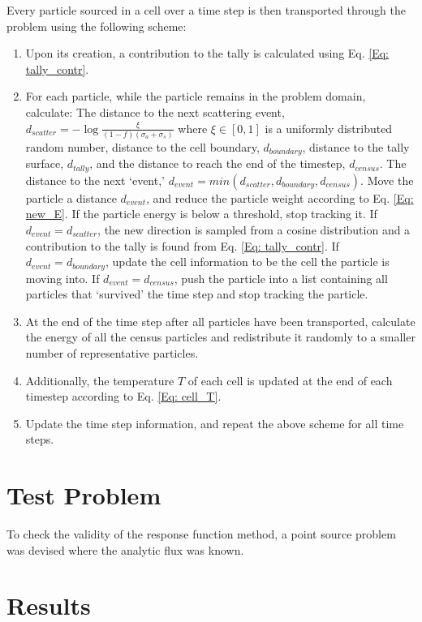 \documentclass[]{article}
\begin{document}
    Every particle sourced in a cell over a time step is then transported through the problem using the following scheme:
	\begin{enumerate}
		\item Upon its creation, a contribution to the tally is calculated using Eq. \ref{Eq: tally_contr}.
		\item For each particle, while the particle remains in the problem domain, calculate:
			\subitem The distance to the next scattering event, $d_{scatter} = -\log{\frac{\xi}{(1 - f)(\sigma_{a} + \sigma_{s})}}$ where $\xi \in [0,1]$ is a uniformly distributed random number, distance to the cell boundary, $d_{boundary}$, distance to the tally surface, $d_{tally}$, and the distance to reach the end of the timestep, $d_{census}$.
			\subitem The distance to the next `event,' $d_{event} = min(d_{scatter}, d_{boundary}, d_{census})$.
			\subitem Move the particle a distance $d_{event}$, and reduce the particle weight according to Eq. \ref{Eq: new_E}.
	     	\subitem If the particle energy is below a threshold, stop tracking it.
			\subitem If $d_{event} = d_{scatter}$, the new direction is sampled from a cosine distribution and a contribution to the tally is found from Eq. \ref{Eq: tally_contr}.
			\subitem If $d_{event} = d_{boundary}$, update the cell information to be the cell the particle is moving into.
			\subitem If $d_{event} = d_{census}$, push the particle into a list containing all particles that `survived' the time step and stop tracking the particle.
		\item At the end of the time step after all particles have been transported, calculate the energy of all the census particles and redistribute it randomly to a smaller number of representative particles.
		\item Additionally, the temperature $T$ of each cell is updated at the end of each timestep according to Eq. \ref{Eq: cell_T}.

		\item Update the time step information, and repeat the above scheme for all time steps.
	\end{enumerate}

\section{Test Problem}
	To check the validity of the response function method, a point source problem was devised where the analytic flux was known.

\section{Results}
\end{document}
